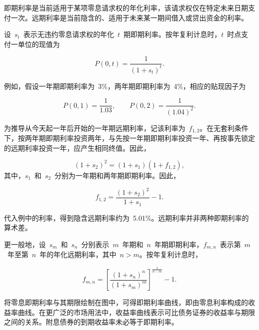 即期利率是当前适用于某项零息请求权的年化利率，该请求权仅在特定未来日期支付一次。远期利率是当前隐含的、适用于未来某一期间借入或贷出资金的利率。

设~$s_t$~表示无违约零息请求权的年化~$t$~期即期利率。按年复利计息时，$t$~时点支付一单位的现值为

\begin{equation}
P(0,t)=\frac{1}{(1+s_t)^t}.
\label{eq:ch6-spot-discount-factor}
\end{equation}

例如，假设一年期即期利率为~3\%，两年期即期利率为~4\%，相应的贴现因子为

\[
P(0,1)=\frac{1}{1.03},
\qquad
P(0,2)=\frac{1}{(1.04)^2}.
\]

为推导从今天起一年后开始的一年期远期利率，记该利率为~$f_{1,2}$。在无套利条件下，按两年期即期利率投资两年，与先按一年期即期利率投资一年、再按事先锁定的远期利率投资一年，应产生相同终值。因此，

\begin{equation}
(1+s_2)^2
=
(1+s_1)(1+f_{1,2}),
\label{eq:ch6-forward-from-spot}
\end{equation}
其中，$s_1$~和~$s_2$~分别为一年期和两年期即期利率。因此，

\begin{equation}
f_{1,2}
=
\frac{(1+s_2)^2}{1+s_1}-1.
\label{eq:ch6-forward-rate}
\end{equation}

代入例中的利率，得到隐含远期利率约为~5.01\%。远期利率并非两种即期利率的算术差。

更一般地，设~$s_m$~和~$s_n$~分别表示~$m$~年期和~$n$~年期即期利率，$f_{m,n}$~表示第~$m$~年至第~$n$~年的年化远期利率，其中~$n>m$。按年复利计息时，

\begin{equation}
f_{m,n}
=
\left[
\frac{(1+s_n)^n}{(1+s_m)^m}
\right]^{\frac{1}{n-m}}
-1.
\label{eq:ch6-general-forward-rate}
\end{equation}

将零息即期利率与其期限绘制在图中，可得即期利率曲线，即由零息利率构成的收益率曲线。在更广泛的市场用法中，收益率曲线表示可比债务证券的收益率与期限之间的关系。附息债券的到期收益率未必等于即期利率。

